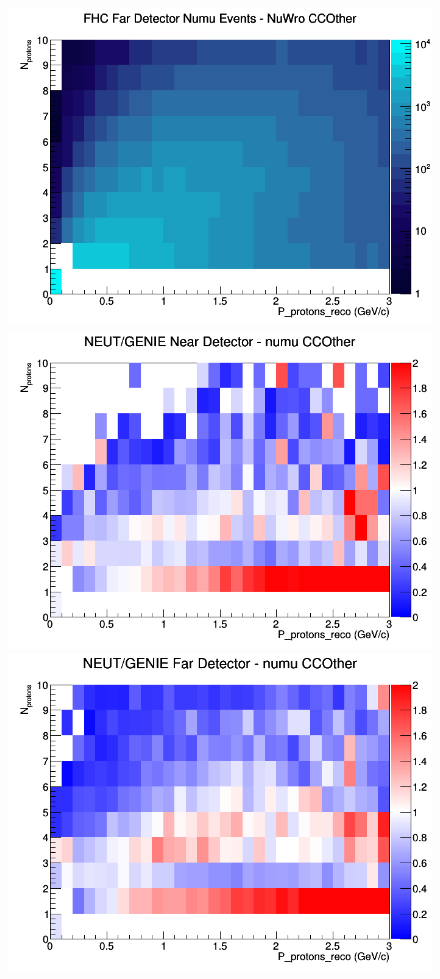 \begin{figure}[h]
\endminipage
{}
\includegraphics[width=\linewidth]{eff_N_P/FGT/protons/CCOther_FHC_FD_numu_N_P_NuWro.png}
\endminipage
\newline
{}
\includegraphics[width=\linewidth]{eff_N_P/FGT/protons/ratios/CCOther_NEUT_GENIE_numu_near_N_P.png}
\endminipage
{}
\includegraphics[width=\linewidth]{eff_N_P/FGT/protons/ratios/CCOther_NEUT_GENIE_numu_far_N_P.png}

\end{figure}
